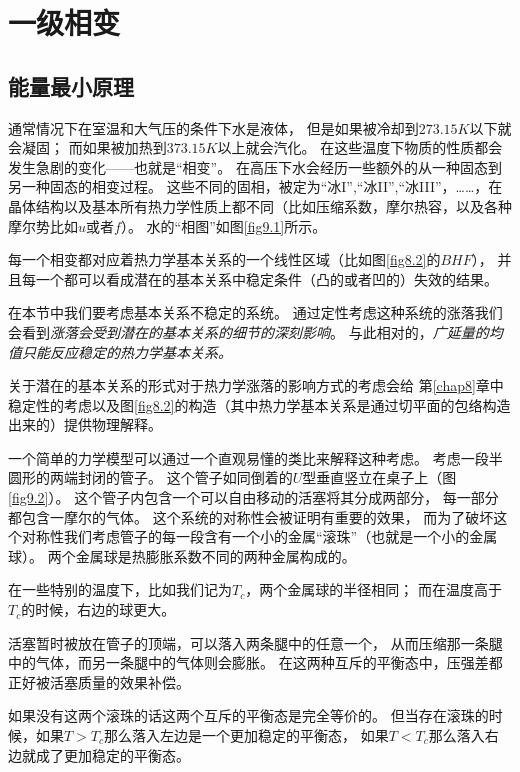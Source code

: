 \chapter{一级相变}
\label{chap9}

\section{能量最小原理}
\label{sec9.1}

通常情况下在室温和大气压的条件下水是液体，
但是如果被冷却到$273.15K$以下就会凝固；
而如果被加热到$373.15K$以上就会汽化。
在这些温度下物质的性质都会发生急剧的变化——也就是“相变”。
在高压下水会经历一些额外的从一种固态到另一种固态的相变过程。
这些不同的固相，被定为“冰I”,“冰II”,“冰III”，……，在晶体结构以及基本所有热力学性质上都不同（比如压缩系数，摩尔热容，以及各种摩尔势比如$u$或者$f$）。
水的“相图”如图\ref{fig9.1}所示。

每一个相变都对应着热力学基本关系的一个线性区域（比如图\ref{fig8.2}的$BHF$），
并且每一个都可以看成潜在的基本关系中稳定条件（凸的或者凹的）失效的结果。

在本节中我们要考虑基本关系不稳定的系统。
通过定性考虑这种系统的涨落我们会看到{\it 涨落会受到潜在的基本关系的细节的深刻影响}。
与此相对的，{\it 广延量的均值只能反应稳定的热力学基本关系。}

关于潜在的基本关系的形式对于热力学涨落的影响方式的考虑会给
第\ref{chap8}章中稳定性的考虑以及图\ref{fig8.2}的构造（其中热力学基本关系是通过切平面的包络构造出来的）提供物理解释。

一个简单的力学模型可以通过一个直观易懂的类比来解释这种考虑。
考虑一段半圆形的两端封闭的管子。
这个管子如同倒着的$U$型垂直竖立在桌子上（图\ref{fig9.2}）。
这个管子内包含一个可以自由移动的活塞将其分成两部分，
每一部分都包含一摩尔的气体。
这个系统的对称性会被证明有重要的效果，
而为了破坏这个对称性我们考虑管子的每一段含有一个小的金属“滚珠”（也就是一个小的金属球）。
两个金属球是热膨胀系数不同的两种金属构成的。

在一些特别的温度下，比如我们记为$T_c$，两个金属球的半径相同；
而在温度高于$T_c$的时候，右边的球更大。

活塞暂时被放在管子的顶端，可以落入两条腿中的任意一个，
从而压缩那一条腿中的气体，而另一条腿中的气体则会膨胀。
在这两种互斥的平衡态中，压强差都正好被活塞质量的效果补偿。

如果没有这两个滚珠的话这两个互斥的平衡态是完全等价的。
但当存在滚珠的时候，如果$T>T_c$那么落入左边是一个更加稳定的平衡态，
如果$T<T_c$那么落入右边就成了更加稳定的平衡态。

